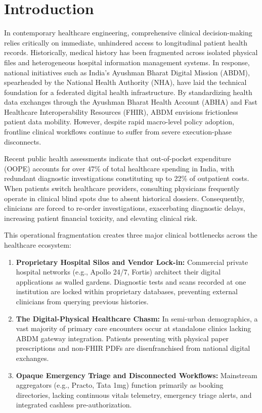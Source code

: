 \documentclass[conference]{IEEEtran}
\begin{document}
\section{Introduction}
In contemporary healthcare engineering, comprehensive clinical decision-making relies critically on immediate, unhindered access to longitudinal patient health records. Historically, medical history has been fragmented across isolated physical files and heterogeneous hospital information management systems. In response, national initiatives such as India's Ayushman Bharat Digital Mission (ABDM), spearheaded by the National Health Authority (NHA), have laid the technical foundation for a federated digital health infrastructure. By standardizing health data exchanges through the Ayushman Bharat Health Account (ABHA) and Fast Healthcare Interoperability Resources (FHIR), ABDM envisions frictionless patient data mobility. However, despite rapid macro-level policy adoption, frontline clinical workflows continue to suffer from severe execution-phase disconnects.

Recent public health assessments indicate that out-of-pocket expenditure (OOPE) accounts for over 47\% of total healthcare spending in India, with redundant diagnostic investigations constituting up to 22\% of outpatient costs. When patients switch healthcare providers, consulting physicians frequently operate in clinical blind spots due to absent historical dossiers. Consequently, clinicians are forced to re-order investigations, exacerbating diagnostic delays, increasing patient financial toxicity, and elevating clinical risk.

This operational fragmentation creates three major clinical bottlenecks across the healthcare ecosystem:
\begin{enumerate}
    \item \textbf{Proprietary Hospital Silos and Vendor Lock-in:} Commercial private hospital networks (e.g., Apollo 24/7, Fortis) architect their digital applications as walled gardens. Diagnostic tests and scans recorded at one institution are locked within proprietary databases, preventing external clinicians from querying previous histories.
    \item \textbf{The Digital-Physical Healthcare Chasm:} In semi-urban demographics, a vast majority of primary care encounters occur at standalone clinics lacking ABDM gateway integration. Patients presenting with physical paper prescriptions and non-FHIR PDFs are disenfranchised from national digital exchanges.
    \item \textbf{Opaque Emergency Triage and Disconnected Workflows:} Mainstream aggregators (e.g., Practo, Tata 1mg) function primarily as booking directories, lacking continuous vitals telemetry, emergency triage alerts, and integrated cashless pre-authorization.
\end{enumerate}
\end{document}
